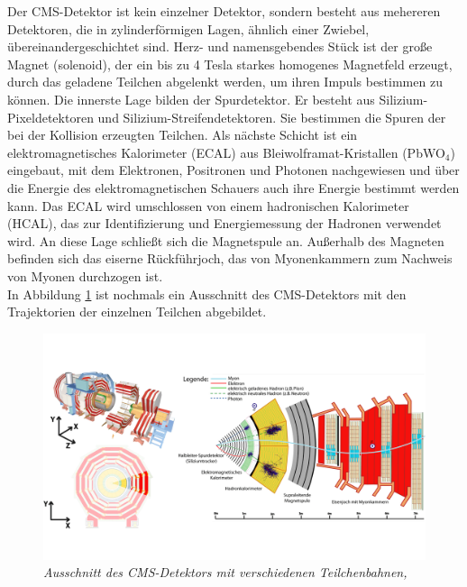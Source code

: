 Der CMS-Detektor ist kein einzelner Detektor, sondern besteht aus mehereren Detektoren, die in zylinderf\"ormigen Lagen, \"ahnlich einer Zwiebel, \"ubereinandergeschichtet sind. Herz- und namensgebendes St\"uck ist der gro\ss e Magnet (solenoid), der ein bis zu \num{4} Tesla starkes homogenes Magnetfeld erzeugt, durch das geladene Teilchen abgelenkt werden, um ihren Impuls bestimmen zu k\"onnen. Die innerste Lage bilden der Spurdetektor. Er besteht aus Silizium-Pixeldetektoren und Silizium-Streifendetektoren. Sie bestimmen die Spuren der bei der Kollision erzeugten Teilchen. Als n\"achste Schicht ist ein elektromagnetisches Kalorimeter (ECAL) aus Bleiwolframat-Kristallen (PbWO$_4$) eingebaut, mit dem Elektronen, Positronen und Photonen nachgewiesen und \"uber die Energie des elektromagnetischen Schauers auch ihre Energie bestimmt werden kann. Das ECAL wird umschlossen von einem hadronischen Kalorimeter (HCAL), das zur Identifizierung und Energiemessung der Hadronen verwendet wird. An diese Lage schlie\ss t sich die Magnetspule an. Au\ss erhalb des Magneten befinden sich das eiserne R\"uckf\"uhrjoch, das von Myonenkammern zum Nachweis von Myonen durchzogen ist.\\
In Abbildung \ref{fig:cms_slice} ist nochmals ein Ausschnitt des CMS-Detektors mit den Trajektorien der einzelnen Teilchen abgebildet.
\begin{figure}[hhh]
 \begin{center}
   \includegraphics[width=\textwidth]{graphics/cms_slice.png}
   \parbox[b]{12cm}{
     \caption[CMS-Detektor]
             {\label{fig:cms_slice} \it\!Ausschnitt des CMS-Detektors mit verschiedenen Teilchenbahnen, \cite{cms_slice}}
   }
 \end{center}
\end{figure}
